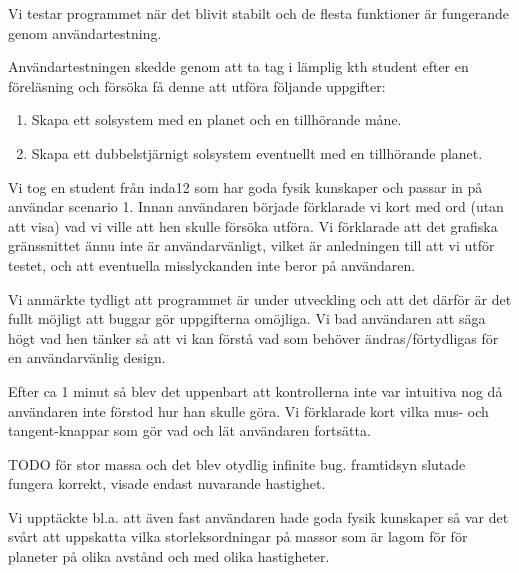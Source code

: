 Vi testar programmet när det blivit stabilt och de flesta funktioner är fungerande genom användartestning.

Användartestningen skedde genom att ta tag i lämplig kth student efter en föreläsning och försöka få denne att utföra följande uppgifter:
\begin{enumerate}
    \item Skapa ett solsystem med en planet och en tillhörande måne.
    \item Skapa ett dubbelstjärnigt solsystem eventuellt med
        en tillhörande planet.
\end{enumerate}

Vi tog en student från inda12 som har goda fysik kunskaper och passar in på användar scenario 1.
Innan användaren började förklarade vi kort med ord (utan att visa)
vad vi ville att hen skulle försöka utföra.
Vi förklarade att det grafiska gränssnittet ännu inte är användarvänligt,
 vilket är anledningen till att vi utför testet, och att eventuella misslyckanden inte beror på användaren.

Vi anmärkte tydligt att programmet är under utveckling och
att det därför är det fullt möjligt att buggar gör uppgifterna omöjliga.
Vi bad användaren att säga högt vad hen tänker så att vi kan förstå vad som
behöver ändras/förtydligas för en användarvänlig design.

Efter ca 1 minut så blev det uppenbart att kontrollerna inte var intuitiva nog då användaren inte förstod hur han skulle göra. Vi förklarade kort vilka mus- och tangent-knappar som gör vad och lät användaren fortsätta.

TODO
för stor massa och det blev otydlig infinite bug.
framtidsyn slutade fungera korrekt, visade endast nuvarande hastighet.

Vi upptäckte bl.a. att även fast användaren hade goda fysik kunskaper så
var det svårt att uppskatta vilka storleksordningar på massor som är
lagom för för planeter på olika avstånd och med olika hastigheter.

